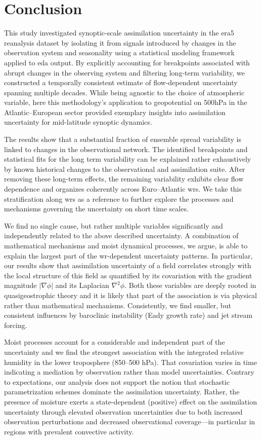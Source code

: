\section{Conclusion}\label{sec:EDA_conc}

This study investigated synoptic-scale assimilation uncertainty in the \gls{era5} reanalysis dataset by isolating it from signals introduced by changes in the observation system and seasonality using a statistical modeling framework applied to \gls{eda} output. By explicitly accounting for breakpoints associated with abrupt changes in the observing system and filtering long-term variability, we constructed a temporally consistent estimate of flow-dependent uncertainty spanning multiple decades. While being agnostic to the choice of atmospheric variable, here this methodology's application to geopotential on 500hPa in the Atlantic--European sector provided exemplary insights into assimilation uncertainty for mid-latitude synoptic dynamics.

The results show that a substantial fraction of ensemble spread variability is linked to changes in the observational network. The identified breakpoints and statistical fits for the long term variability can be explained rather exhaustively by known historical changes to the observational and assimilation suite. After removing these long-term effects, the remaining variability exhibits clear flow dependence and organizes coherently across Euro--Atlantic \glspl{wr}. We take this stratification along \glspl{wr} as a reference to further explore the processes and mechanisms governing the uncertainty on short time scales.

We find no single cause, but rather multiple variables significantly and independently related to the above described uncertainty. A combination of mathematical mechanisms and moist dynamical processes, we argue, is able to explain the largest part of the \gls{wr}-dependent uncertainty patterns. In particular, our results show that assimilation uncertainty of a field correlates strongly with the local structure of this field as quantified by its covariation with the gradient magnitude $|\nabla \phi |$ and its Laplacian $\nabla^2 \phi$. Both these variables are deeply rooted in quasigeostrophic theory and it is likely that part of the association is via physical rather than mathematical mechanisms. Consistently, we find smaller, but consistent influences by baroclinic instability (Eady growth rate) and jet stream forcing.

Moist processes account for a considerable and independent part of the uncertainty and we find the strongest association with the integrated relative humidity in the lower troposphere (850--500 hPa). That covariation varies in time indicating a mediation by observation rather than model uncertainties. Contrary to expectations, our analysis does not support the notion that stochastic parametrization schemes dominate the assimilation uncertainty. Rather, the presence of moisture exerts a state-dependent (positive) effect on the assimilation uncertainty through elevated observation uncertainties due to both increased observation perturbations and decreased observational coverage---in particular in regions with prevalent convective activity.

